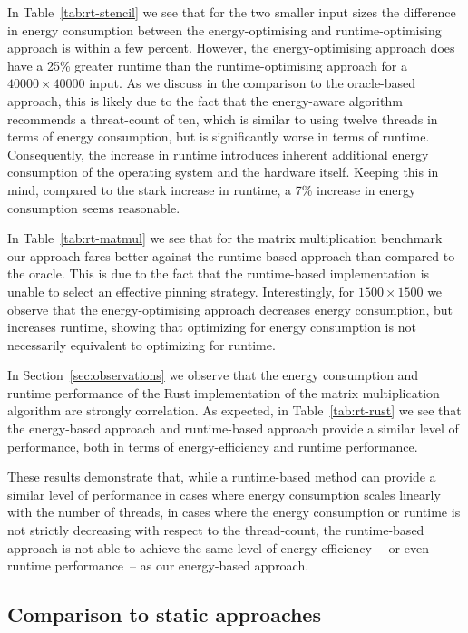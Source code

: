In Table~\ref{tab:rt-stencil} we see that for the two smaller input sizes the difference in energy consumption between the energy-optimising and runtime-optimising approach is within a few percent.
However, the energy-optimising approach does have a 25\% greater runtime than the runtime-optimising approach for a $40000 \times 40000$ input.
As we discuss in the comparison to the oracle-based approach, this is likely due to the fact that the energy-aware algorithm recommends a threat-count of ten, which is similar to using twelve threads in terms of energy consumption, but is significantly worse in terms of runtime.
Consequently, the increase in runtime introduces inherent additional energy consumption of the operating system and the hardware itself.
Keeping this in mind, compared to the stark increase in runtime, a 7\% increase in energy consumption seems reasonable.

In Table~\ref{tab:rt-matmul} we see that for the matrix multiplication benchmark our approach fares better against the runtime-based approach than compared to the oracle.
This is due to the fact that the runtime-based implementation is unable to select an effective pinning strategy.
Interestingly, for $1500 \times 1500$ we observe that the energy-optimising approach decreases energy consumption, but increases runtime, showing that optimizing for energy consumption is not necessarily equivalent to optimizing for runtime.

In Section~\ref{sec:observations} we observe that the energy consumption and runtime performance of the Rust implementation of the matrix multiplication algorithm are strongly correlation.
As expected, in Table~\ref{tab:rt-rust} we see that the energy-based approach and runtime-based approach provide a similar level of performance, both in terms of energy-efficiency and runtime performance.

These results demonstrate that, while a runtime-based method can provide a similar level of performance in cases where energy consumption scales linearly with the number of threads, in cases where the energy consumption or runtime is not strictly decreasing with respect to the thread-count, the runtime-based approach is not able to achieve the same level of energy-efficiency --~or even runtime performance~-- as our energy-based approach.

\subsection{Comparison to static approaches}\label{sec:evalation-static}

